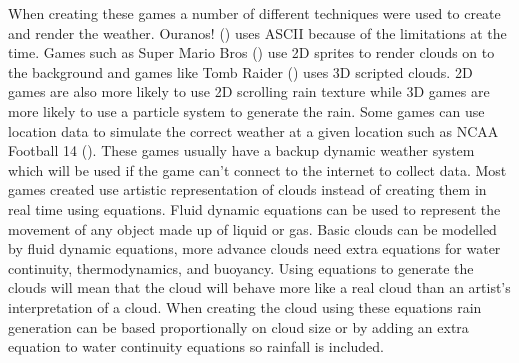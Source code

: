 When creating these games a number of different techniques were used to create and render the weather.
Ouranos! (\citeyear{Ouranos80}) uses ASCII because of the limitations at the time.
Games such as Super Mario Bros (\citeyear{SMB85}) use 2D sprites to render clouds on to the background and games like Tomb Raider (\citeyear{TombRaider13}) uses 3D scripted clouds.
2D games are also more likely to use 2D scrolling rain texture while 3D games are more likely to use a particle system to generate the rain.
Some games can use location data to simulate the correct weather at a given location such as NCAA Football 14 (\citeyear{NCAAF13}).
These games usually have a backup dynamic weather system which will be used if the game can't connect to the internet to collect data. 
Most games created use artistic representation of clouds instead of creating them in real time using equations.
Fluid dynamic equations can be used to represent the movement of any object made up of liquid or gas.
Basic clouds can be modelled by fluid dynamic equations, more advance clouds need extra equations for water continuity, thermodynamics, and buoyancy.
Using equations to generate the clouds will mean that the cloud will behave more like a real cloud than an artist's interpretation of a cloud.
When creating the cloud using these equations rain generation can be based proportionally on cloud size or by adding an extra equation to water continuity equations so rainfall is included.